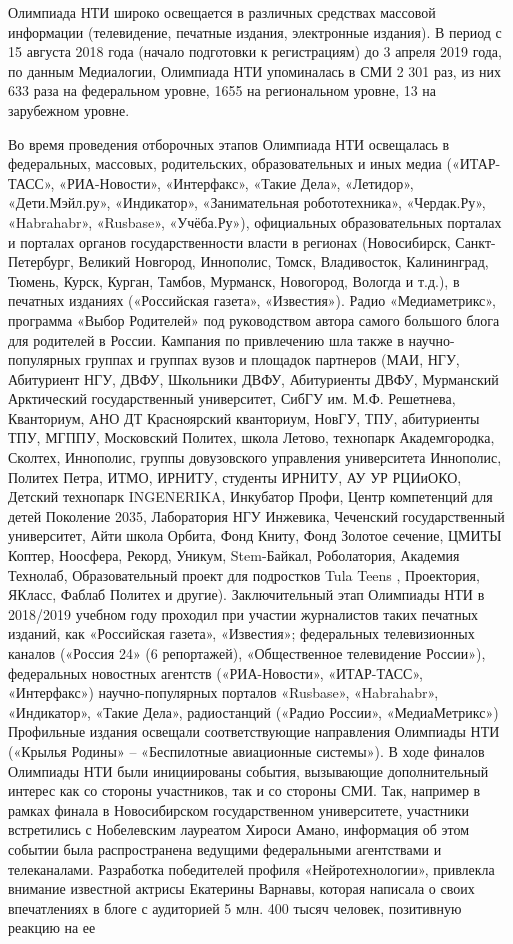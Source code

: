 Олимпиада НТИ широко освещается в различных средствах массовой информации (телевидение, печатные издания, электронные издания). В период с 15 августа 2018 года (начало подготовки к регистрациям) до 3 апреля 2019 года, по данным Медиалогии, Олимпиада НТИ упоминалась в СМИ 2 301 раз, из них 633 раза на федеральном уровне, 1655 на региональном уровне, 13 на зарубежном уровне. 

Во время проведения отборочных этапов Олимпиада НТИ освещалась в федеральных, массовых, родительских, образовательных и иных медиа («ИТАР-ТАСС», «РИА-Новости», «Интерфакс», «Такие Дела», «Летидор», «Дети.Мэйл.ру», «Индикатор», «Занимательная робототехника», «Чердак.Ру», «Habrahabr», «Rusbase», \linebreak «Учёба.Ру»), официальных образовательных порталах и порталах органов государственности власти в регионах  (Новосибирск, Санкт-Петербург, Великий Новгород, Иннополис, Томск, Владивосток, Калининград, Тюмень, Курск, Курган, Тамбов, Мурманск, Новогород, Вологда и т.д.), в печатных изданиях («Российская газета», «Известия»). Радио «Медиаметрикс», программа «Выбор Родителей» под руководством автора самого большого блога для родителей в России.  Кампания по привлечению шла также в научно-популярных группах и группах вузов и площадок партнеров (МАИ, НГУ, Абитуриент НГУ,  ДВФУ, Школьники ДВФУ, Абитуриенты ДВФУ, Мурманский Арктический государственный университет, СибГУ им. М.Ф. Решетнева, Кванториум, АНО ДТ Красноярский кванториум,  НовГУ, ТПУ, абитуриенты ТПУ, МГППУ, Московский Политех, школа Летово, технопарк Академгородка, Сколтех, Иннополис, группы довузовского управления университета Иннополис, Политех Петра, ИТМО, ИРНИТУ, студенты ИРНИТУ, АУ УР РЦИиОКО, Детский технопарк INGENERIKA, Инкубатор Профи, Центр компетенций для детей Поколение 2035, Лаборатория НГУ Инжевика, Чеченский государственный университет, Айти школа Орбита, Фонд Книту, Фонд Золотое сечение, ЦМИТЫ Коптер, Ноосфера, Рекорд, Уникум, Stem-Байкал, Роболатория, Академия Технолаб, Образовательный проект для подростков Tula Teens ,  Проектория, ЯКласс, Фаблаб Политех и другие).  Заключительный этап Олимпиады НТИ в 2018/2019 учебном году проходил при участии журналистов таких печатных изданий, как «Российская газета», «Известия»; федеральных телевизионных каналов («Россия 24» (6 репортажей), «Общественное телевидение России»), федеральных новостных агентств («РИА-Новости», «ИТАР-ТАСС», «Интерфакс») научно-популярных порталов  «Rusbase», «Habrahabr», «Индикатор», «Такие Дела», радиостанций («Радио России», «МедиаМетрикс») Профильные издания освещали соответствующие направления Олимпиады НТИ («Крылья Родины» – «Беспилотные авиационные системы»). В ходе финалов Олимпиады НТИ были инициированы события, вызывающие дополнительный интерес как со стороны участников, так и со стороны СМИ. Так, например в рамках финала в Новосибирском государственном университете, участники встретились с Нобелевским лауреатом Хироси Амано, информация об этом событии была распространена ведущими федеральными агентствами и телеканалами. Разработка победителей профиля «Нейротехнологии», привлекла внимание известной актрисы Екатерины Варнавы, которая написала о своих впечатлениях в блоге с аудиторией 5 млн. 400 тысяч человек, позитивную реакцию на ее 